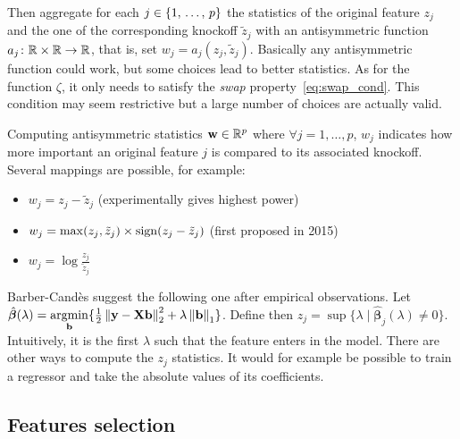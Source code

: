 Then aggregate for each $j \in \left\{ 1,\, \dots,\, p \right\}$ the statistics of the original feature $z_j$ and the one of the corresponding
knockoff $\tilde{z}_j$ with an antisymmetric function $a_j \colon \mathbb{R}\times\mathbb{R} \to \mathbb{R}$,
that is, set $w_j = a_j(z_j, \tilde{z}_j)$.
Basically any antisymmetric function could work, but some choices lead to better statistics.
As for the function $\zeta$, it only needs to satisfy the \emph{swap} property~\ref{eq:swap_cond}.
This condition may seem restrictive but a large number of choices are actually valid.

Computing antisymmetric statistics $\mathbf{w} \in \mathbb{R}^p$ where $\forall j = 1, \dots, p$, $w_j$
indicates how more important an original feature $j$ is compared to its associated knockoff.
Several mappings are possible, for example:
\begin{itemize}
        \item $w_j = z_j - \tilde{z}_j$ (experimentally gives highest power)
        \item $w_j = \max(z_j, \tilde{z}_j) \times \operatorname*{sign}(z_j - \tilde{z}_j)$ (first proposed in 2015)
        \item $w_j = \log\frac{z_j}{\tilde{z}_j}$
\end{itemize}
Barber-Candès suggest the following one after empirical observations.
Let $\hat{\bm{\beta}}(\lambda) = \underset{\mathbf{b}}{\operatorname{argmin}}
\{\frac{1}{2}\left\lVert\mathbf{y} - \mathbf{X}\mathbf{b}\right\rVert_2^2 + \lambda\left\lVert\mathbf{b}\right\rVert_1\}$.
Define then $z_j = \sup\{\lambda \mid \mathbf{\hat{\beta}}_j(\lambda) \neq 0\}$.
Intuitively, it is the first $\lambda$ such that the feature enters in the model.
There are other ways to compute the $z_j$ statistics.
It would for example be possible to train a regressor and take the absolute values of its coefficients.

\subsection{Features selection}\label{subsec:kfs}

